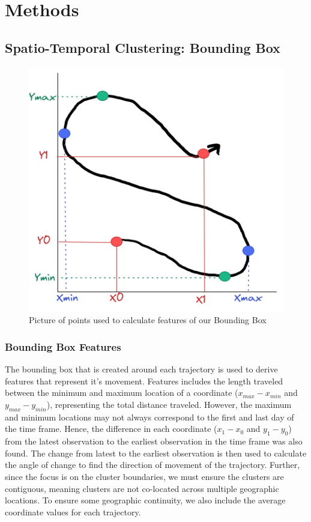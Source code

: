\documentclass[12pt]{article}
\begin{document}
\hypertarget{methods}{%
\section{Methods}\label{methods}}

\hypertarget{spatio-temporal-clustering-bounding-box}{%
\subsection{Spatio-Temporal Clustering: Bounding
Box}\label{spatio-temporal-clustering-bounding-box}}

\begin{figure}[tbp]

{\centering \includegraphics[width=0.5\linewidth,]{images/bounding-box} 

}

\caption[Bounding Example]{Picture of points used to calculate features of our Bounding Box}\label{fig:bb-pic}
\end{figure}

\hypertarget{bounding-box-features}{%
\subsubsection{Bounding Box Features}\label{bounding-box-features}}

The bounding box that is created around each trajectory is used to
derive features that represent it's movement. Features includes the
length traveled between the minimum and maximum location of a coordinate
(\(x_{max} - x_{min}\) and \(y_{max} - y_{min}\)), representing the
total distance traveled. However, the maximum and minimum locations may
not always correspond to the first and last day of the time frame.
Hence, the difference in each coordinate (\(x_{1} - x_{0}\) and
\(y_{1} - y_{0}\)) from the latest observation to the earliest
observation in the time frame was also found. The change from latest to
the earliest observation is then used to calculate the angle of change
to find the direction of movement of the trajectory. Further, since the
focus is on the cluster boundaries, we must ensure the clusters are
contiguous, meaning clusters are not co-located across multiple
geographic locations. To ensure some geographic continuity, we also
include the average coordinate values for each trajectory.
\end{document}
